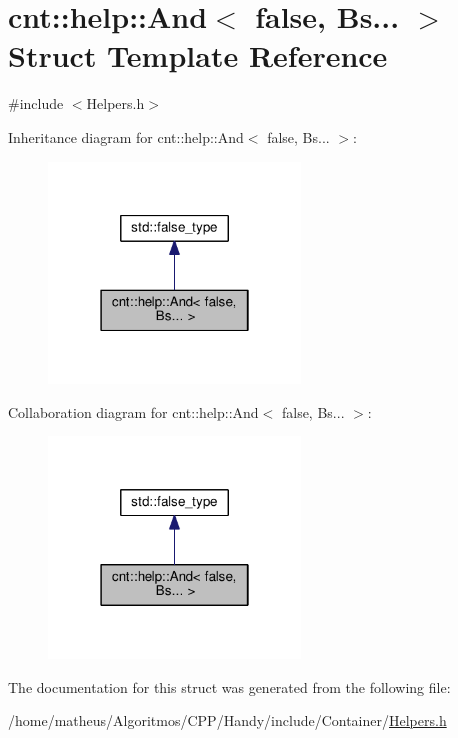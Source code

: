 \hypertarget{structcnt_1_1help_1_1And_3_01false_00_01Bs_8_8_8_01_4}{}\section{cnt\+:\+:help\+:\+:And$<$ false, Bs... $>$ Struct Template Reference}
\label{structcnt_1_1help_1_1And_3_01false_00_01Bs_8_8_8_01_4}


{\ttfamily \#include $<$Helpers.\+h$>$}



Inheritance diagram for cnt\+:\+:help\+:\+:And$<$ false, Bs... $>$\+:\nopagebreak
\begin{figure}[H]
\begin{center}
\leavevmode
\includegraphics[width=190pt]{structcnt_1_1help_1_1And_3_01false_00_01Bs_8_8_8_01_4__inherit__graph}
\end{center}
\end{figure}


Collaboration diagram for cnt\+:\+:help\+:\+:And$<$ false, Bs... $>$\+:\nopagebreak
\begin{figure}[H]
\begin{center}
\leavevmode
\includegraphics[width=190pt]{structcnt_1_1help_1_1And_3_01false_00_01Bs_8_8_8_01_4__coll__graph}
\end{center}
\end{figure}


The documentation for this struct was generated from the following file\+:\begin{DoxyCompactItemize}
\item 
/home/matheus/\+Algoritmos/\+C\+P\+P/\+Handy/include/\+Container/\hyperlink{Container_2Helpers_8h}{Helpers.\+h}\end{DoxyCompactItemize}

